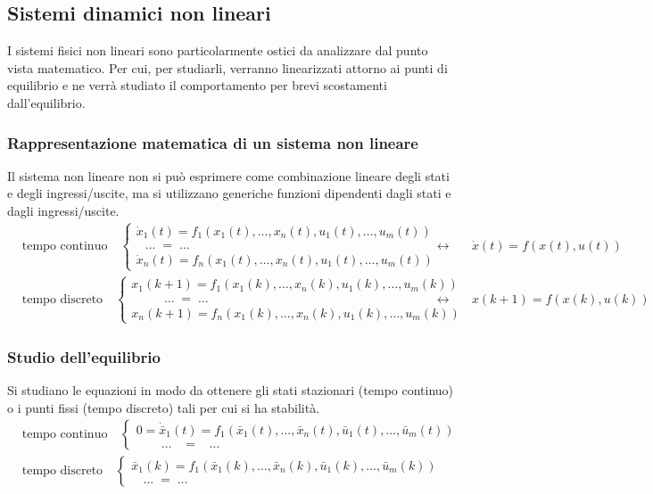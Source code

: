 \subsection{Sistemi dinamici non lineari}
I sistemi fisici non lineari sono particolarmente ostici da analizzare dal punto vista matematico. Per cui, per studiarli, verranno
linearizzati attorno ai punti di equilibrio e ne verrà studiato il comportamento per brevi scostamenti dall'equilibrio.

\subsubsection*{Rappresentazione matematica di un sistema non lineare}
Il sistema non lineare non si può esprimere come combinazione lineare degli stati e degli ingressi/uscite, ma si utilizzano generiche
funzioni dipendenti dagli stati e dagli ingressi/uscite.
\begin{align*}
	&\text{tempo continuo} \quad \begin{cases} \dot{x}_1(t) = f_1 (x_1(t), \dots, x_n(t), u_1(t), \dots, u_m(t)) \\ \;\;\, \dots \; = \; \dots \\ \dot{x}_n(t) = f_n (x_1(t), \dots, x_n(t), u_1(t), \dots, u_m(t)) \end{cases} &\leftrightarrow \quad &\dot{x}(t) = f(x(t),u(t)) \\
	&\text{tempo discreto} \quad \begin{cases} x_1(k+1) = f_1 (x_1(k), \dots, x_n(k), u_1(k), \dots, u_m(k)) \\ \qquad\;\,\, \dots \; = \; \dots \\ x_n(k+1) = f_n (x_1(k), \dots, x_n(k), u_1(k), \dots, u_m(k)) \end{cases} &\leftrightarrow \quad &x(k+1) = f(x(k),u(k))
\end{align*}

\subsubsection*{Studio dell'equilibrio}
Si studiano le equazioni in modo da ottenere gli stati stazionari (tempo continuo) o i punti fissi (tempo discreto) tali per cui
si ha stabilità.
\begin{align*}
	&\text{tempo continuo} \quad \begin{cases} 0 = \dot{\bar{x}}_1(t) = f_1 (\bar{x}_1(t), \dots, \bar{x}_n(t), \bar{u}_1(t), \dots, \bar{u}_m(t)) \\ \qquad \dots \;\;\; = \;\;\; \dots \end{cases} \\
	&\text{tempo discreto} \quad \begin{cases} \bar{x}_1(k) = f_1 (\bar{x}_1(k), \dots, \bar{x}_n(k), \bar{u}_1(k), \dots, \bar{u}_m(k)) \\ \;\;\:\, \dots \; = \; \dots  \end{cases}
\end{align*}

